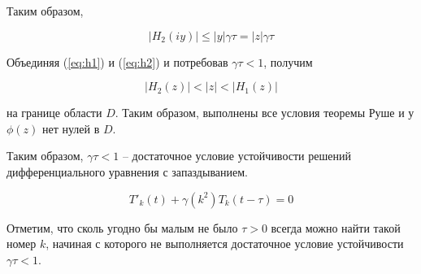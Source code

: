 Таким образом,

\begin{equation}\label{eq:h2}
|H_2(iy)| \leq |y| \gamma \tau = |z| \gamma \tau
\end{equation}

Объединяя (\ref{eq:h1}) и (\ref{eq:h2}) и потребовав $\gamma \tau < 1$, получим

\begin{equation}
|H_2(z)| < |z| < |H_1(z)|
\end{equation}

на границе области $D$. Таким образом, выполнены все условия теоремы Руше и у $\phi(z)$ нет нулей в $D$.

Таким образом, $\gamma \tau < 1$ \--- достаточное условие устойчивости решений дифференциального уравнения с запаздыванием.

\begin{equation}
{T'}_{k}(t) + \gamma(k^2) T_k (t-\tau)=0
\end{equation}

Отметим, что сколь угодно бы малым не было $\tau>0$ всегда можно найти такой номер $k$, начиная с которого не выполняется достаточное условие устойчивости $\gamma \tau < 1$.